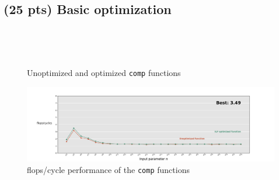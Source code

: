 \documentclass[tikz,14pt,fleqn]{article}
\begin{document}
\subsubsection{} %

\subsubsection{} %

\subsubsection{} %


\subsection{(25 pts) Basic optimization}
\subsubsection{} %
\begin{figure}[h!]
    \begin{subfigure}{1\linewidth}
        \inputminted[fontsize=\scriptsize, bgcolor=CODEBG, firstline=62, lastline=68]{C}{../ex4/lu4.c}
    \end{subfigure}\\
    \begin{subfigure}{1\linewidth}
        \inputminted[fontsize=\scriptsize, bgcolor=CODEBG, firstline=62, lastline=82]{C}{../ex4/lu4_optimized.c}
    \end{subfigure}
    \caption{Unoptimized and optimized \texttt{comp} functions}
    \label{fig:4.comp_functions}
\end{figure}
\begin{figure}
    \vspace*{-0.7cm}
    \includegraphics[width=\linewidth]{../out/ex4.pdf}
    \caption{flops/cycle performance of the \texttt{comp} functions}
    \label{fig:4.comp_functions_plot}
\end{figure}
\subsubsection{} %
\end{document}
